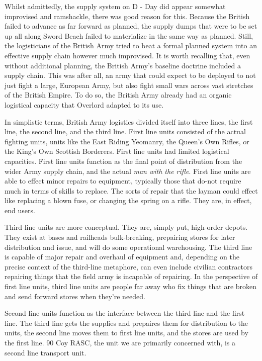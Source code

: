 \documentclass[noraggedright]{turabian-researchpaper}
\begin{document}
Whilst admittedly, the supply system on D - Day did appear somewhat improvised
and ramshackle, there was good reason for this.  Because the British failed to
advance as far forward as planned, the supply dumps that were to be set up all
along Sword Beach failed to materialize in the same way as planned.  Still,
the logisticians of the British Army tried to beat a formal planned system
into an effective supply chain however much improvised.  It is worth recalling
that, even without additional planning, the British Army's baseline doctrine 
included a supply chain.  This was after all, an army that could expect to be
deployed to not just fight a large, European Army, but also fight small wars
across vast stretches of the British Empire.  To do so, the British Army already
had an organic logistical capacity that Overlord adapted to its use.  

In simplistic terms, British Army logistics divided itself into three lines, 
the first line, the second line, and the third line.  First line units 
consisted of the actual fighting units, units like the East Riding Yeomanry,
the Queen's Own Rifles, or the King's Own Scottish Borderers.  First line 
units had limited logistical capacities.  First line units function as the 
final point of distribution from the wider Army supply chain, and the actual 
\textit{man with the rifle}.  First line units are able to effect minor repairs
to equipment, typically those that do-not require much in terms of skills to 
replace.  The sorts of repair that the layman could effect like replacing a 
blown fuse, or changing the spring on a rifle.  They are, in effect, end 
users.\autocite[s. 58(1)i, s. 102]{FSR1}

Third line units are more conceptual.  They are, simply put, high-order depots. 
They exist at bases and railheads bulk-breaking, prepairing stores for later 
distribution and issue, and will do some operational warehousing.\autocite
[s. 105(2)]{FSR1} The third line is capable of major 
repair and overhaul of equipment and, depending on the precise context of the 
third-line metaphore, can even include civilian contractors repairing things
that the field army is incapable of repairing.  In the perspective of first 
line units, third line units are people far away who fix things that are 
broken and send forward stores when they're needed.

Second line units function as the interface between the third line and the
first line.\autocite[s. 101]{FSR1}  The third line gets the supplies and 
prepaires them for distribution to the units, the second line moves them to 
first line units, and the stores are used by the first line.  90 Coy RASC, 
the unit we are primarily concerned with, is a second line transport unit.
\end{document}
